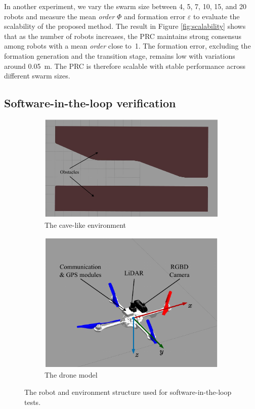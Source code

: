 In another experiment, we vary the swarm size between 4, 5, 7, 10, 15, and 20 robots and measure the mean \textit{order} $\Phi$ and formation error $\varepsilon$ to evaluate the scalability of the proposed method. The result in Figure \ref{fig:scalability} shows that as the number of robots increases, the PRC maintains strong consensus among robots with a mean \textit{order} close to~1. The formation error, excluding the formation generation and the transition stage, remains low with variations around 0.05~m. The PRC is therefore scalable with stable performance across different swarm sizes.

\subsection{Software-in-the-loop verification}
\begin{figure}[h!]
    \centering
    \begin{subfigure}[b]{0.56\textwidth}
    \includegraphics[width=\textwidth]{paper3/images/tunnel.pdf}
    \caption{The cave-like environment}
    \label{fig:gazebo_tunnel}
    \end{subfigure}
    \begin{subfigure}[b]{0.42\textwidth}
    \includegraphics[width=\textwidth]{paper3/images/hummingbird.pdf}
    \caption{The drone model~\cite{Bui2022,Furrer2016}}
    \label{fig:gazebo_hummingbird}
    \end{subfigure}
    \caption{The robot and environment structure used for software-in-the-loop tests.}
    \label{fig:sil}
\end{figure}
